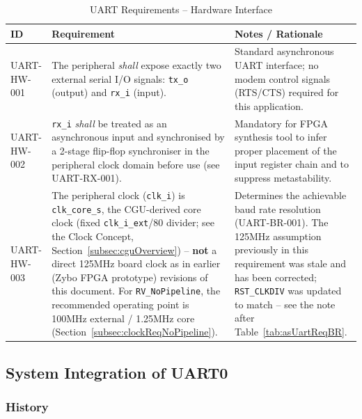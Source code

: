 \begin{table}[H]
\caption{UART Requirements -- Hardware Interface}
\label{tab:asUartReqHW}
\centering
\begin{tabularx}{\textwidth}{|l |X |X|}
  \hline
  ID & Requirement & Notes / Rationale \\
  \hline
  \hline
  UART-HW-001 &
    The peripheral \textit{shall} expose exactly two external serial I/O
    signals: \texttt{tx\_o} (output) and \texttt{rx\_i} (input). &
    Standard asynchronous UART interface; no modem control signals
    (RTS/CTS) required for this application. \\
  \hline
  UART-HW-002 &
    \texttt{rx\_i} \textit{shall} be treated as an asynchronous input
    and synchronised by a 2-stage flip-flop synchroniser in the
    peripheral clock domain before use (see UART-RX-001). &
    Mandatory for FPGA synthesis tool to infer proper placement
    of the input register chain and to suppress metastability. \\
  \hline
  UART-HW-003 &
    The peripheral clock (\texttt{clk\_i}) is \texttt{clk\_core\_s}, the
    CGU-derived core clock (fixed \texttt{clk\_i\_ext}/80 divider; see the
    Clock Concept, Section~\ref{subsec:cguOverview}) -- \textbf{not} a
    direct 125\;MHz board clock as in earlier (Zybo FPGA prototype)
    revisions of this document.
    For \texttt{RV\_NoPipeline}, the recommended operating point is
    100\;MHz external / 1.25\;MHz core (Section~\ref{subsec:clockReqNoPipeline}). &
    Determines the achievable baud rate resolution (UART-BR-001).
    The 125\;MHz assumption previously in this requirement was stale and
    has been corrected; \texttt{RST\_CLKDIV} was updated to match -- see
    the note after Table~\ref{tab:asUartReqBR}. \\
  \hline
\end{tabularx}
\end{table}

\subsection{System Integration of UART0}

\subsubsection{History}


